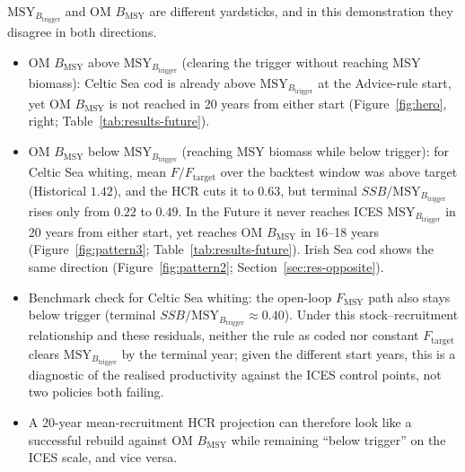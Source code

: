 \documentclass[11pt,a4paper]{article}
\newcommand{\Fmsy}{F_{\mathrm{MSY}}}
\newcommand{\Btrig}{\mathrm{MSY}_{B_{\mathrm{trigger}}}}
\newcommand{\Bmsy}{B_{\mathrm{MSY}}}
\newcommand{\Ftar}{F_{\mathrm{target}}}
\begin{document}
$\Btrig$ and OM $\Bmsy$ are different yardsticks, and in this
demonstration they disagree in both directions.
\begin{itemize}
  \item OM $\Bmsy$ above $\Btrig$ (clearing the trigger without reaching
        MSY biomass): Celtic Sea cod is already above $\Btrig$ at the
        Advice-rule start, yet OM $\Bmsy$ is not reached in 20 years
        from either start (Figure~\ref{fig:hero}, right;
        Table~\ref{tab:results-future}).
  \item OM $\Bmsy$ below $\Btrig$ (reaching MSY biomass while below
        trigger): for Celtic Sea whiting, mean $F/\Ftar$ over the
        backtest window was above target (Historical $1.42$), and the
        HCR cuts it to $0.63$, but terminal $SSB/\Btrig$ rises only from
        $0.22$ to $0.49$. In the Future it never reaches ICES $\Btrig$
        in 20 years from either start, yet reaches OM $\Bmsy$ in 16--18
        years (Figure~\ref{fig:pattern3};
        Table~\ref{tab:results-future}). Irish Sea cod shows the same
        direction (Figure~\ref{fig:pattern2}; Section~\ref{sec:res-opposite}).
  \item Benchmark check for Celtic Sea whiting: the open-loop $\Fmsy$
        path also stays below trigger (terminal $SSB/\Btrig \approx
        0.40$). Under this stock--recruitment relationship and these
        residuals, neither the rule as coded nor constant $\Ftar$
        clears $\Btrig$ by the terminal year; given the different start
        years, this is a diagnostic of the realised productivity against
        the ICES control points, not two policies both failing.
  \item A 20-year mean-recruitment HCR projection can therefore look
        like a successful rebuild against OM $\Bmsy$ while remaining
        ``below trigger'' on the ICES scale, and vice versa.
\end{itemize}
\end{document}
